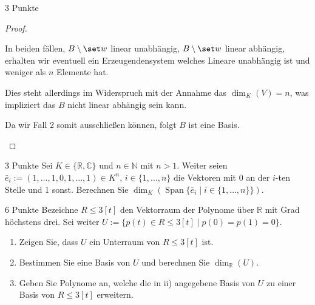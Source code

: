 \documentclass{../problemset}
\begin{document}
\begin{problem}{3 Punkte}
\begin{proof}
\begin{itemize}
\begin{itemize}
			            In beiden fällen, $B \setminus \set w$ linear unabhängig, $B \setminus \set w$ linear abhängig,
			            erhalten wir eventuell ein Erzeugendensystem welches Lineare unabhängig ist und weniger als $n$ Elemente hat.

			            Dies steht allerdings im Widerspruch mit der Annahme das $\dim_K(V) = n$, was impliziert das $B$ nicht linear abhängig sein kann.
		      \end{itemize}

		      Da wir Fall 2 somit ausschließen können, folgt $B$ ist eine Basis. \checkmark
	\end{itemize}
\end{proof}
\end{problem}

\begin{problem}{3 Punkte}
Sei $K \in \{ \mathbb{R}, \mathbb{C} \}$ und $n \in \mathbb{N}$ mit $n > 1$. Weiter seien $\bar{e}_i := (1, \ldots, 1, 0, 1, \ldots, 1) \in K^n$, $i \in \{1, \ldots, n\}$ die Vektoren mit 0 an der $i$-ten Stelle und 1 sonst. Berechnen Sie $\dim_K(\operatorname{Span}\{\bar{e}_i \mid i \in \{1, \ldots, n\}\})$.
\end{problem}

\begin{problem}{6 Punkte}
Bezeichne $R\leq 3[t]$ den Vektorraum der Polynome über $\mathbb{R}$ mit Grad höchstens drei. Sei weiter $U := \{p(t) \in R\leq 3[t] \mid p(0) = p(1) = 0\}$.
\begin{enumerate}
	\item Zeigen Sie, dass $U$ ein Unterraum von $R\leq 3[t]$ ist.
	\item Bestimmen Sie eine Basis von $U$ und berechnen Sie $\dim_{\mathbb{R}}(U)$.
	\item Geben Sie Polynome an, welche die in ii) angegebene Basis von $U$ zu einer Basis von $R\leq 3[t]$ erweitern.
\end{enumerate}
\end{problem}
\end{document}
